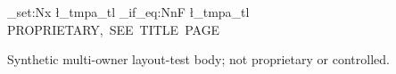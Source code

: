 \documentclass{linearspace-report}
\begin{document}
\ExplSyntaxOn
\tl_set:Nx \l_tmpa_tl {\LSBannerText}
\tl_if_eq:NnF \l_tmpa_tl {PROPRIETARY,~SEE~TITLE~PAGE}
  {\PackageError{linearspace-test}{Multi-owner~corporate~banner~regression}{}}
\ExplSyntaxOff
\LSMakeReportTitle
Synthetic multi-owner layout-test body; not proprietary or controlled.
\end{document}
